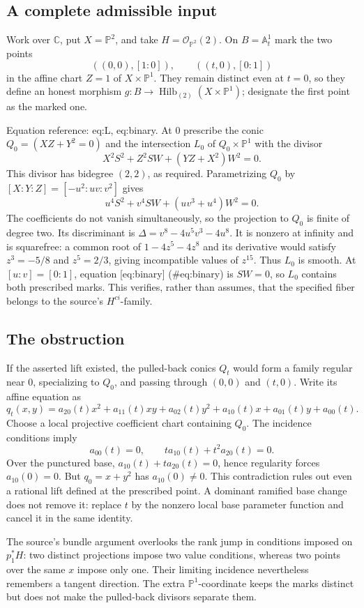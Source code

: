 \documentclass[10pt]{article}
\begin{document}
\subsection*{A complete admissible input}
Work over \(\mathbb C\), put \(X=\mathbb P^2\), and take \(H=\mathcal O_{\mathbb P^2}(2)\). On \(B=\mathbb A^1_t\) mark the two points \[((0,0),[1:0]),\qquad ((t,0),[0:1])\] in the affine chart \(Z=1\) of \(X\times\mathbb P^1\). They remain distinct even at \(t=0\), so they define an honest morphism \(g:B\to\operatorname{Hilb}_{(2)}(X\times\mathbb P^1)\); designate the first point as the marked one.\par
Equation reference: eq:L, eq:binary. At \(0\) prescribe the conic \(Q_0=(XZ+Y^2=0)\) and the intersection \(L_0\) of \(Q_0\times\mathbb P^1\) with the divisor \[
 X^2S^2+Z^2SW+(YZ+X^2)W^2=0.\] This divisor has bidegree \((2,2)\), as required. Parametrizing \(Q_0\) by \([X:Y:Z]=[-u^2:uv:v^2]\) gives \[
 u^4S^2+v^4SW+(uv^3+u^4)W^2=0.\] The coefficients do not vanish simultaneously, so the projection to \(Q_0\) is finite of degree two. Its discriminant is \(\Delta=v^8-4u^5v^3-4u^8\). It is nonzero at infinity and is squarefree: a common root of \(1-4z^5-4z^8\) and its derivative would satisfy \(z^3=-5/8\) and \(z^5=2/3\), giving incompatible values of \(z^{15}\). Thus \(L_0\) is smooth. At \([u:v]=[0:1]\), equation [eq:binary] (\#eq:binary) is \(SW=0\), so \(L_0\) contains both prescribed marks. This verifies, rather than assumes, that the specified fiber belongs to the source’s \(H^{ci}\)-family.\par
\subsection*{The obstruction}
If the asserted lift existed, the pulled-back conics \(Q_t\) would form a family regular near \(0\), specializing to \(Q_0\), and passing through \((0,0)\) and \((t,0)\). Write its affine equation as \[q_t(x,y)=a_{20}(t)x^2+a_{11}(t)xy+a_{02}(t)y^2
              +a_{10}(t)x+a_{01}(t)y+a_{00}(t).\] Choose a local projective coefficient chart containing \(Q_0\). The incidence conditions imply \[a_{00}(t)=0,\qquad t a_{10}(t)+t^2a_{20}(t)=0.\] Over the punctured base, \(a_{10}(t)+t a_{20}(t)=0\), hence regularity forces \(a_{10}(0)=0\). But \(q_0=x+y^2\) has \(a_{10}(0)\neq0\). This contradiction rules out even a rational lift defined at the prescribed point. A dominant ramified base change does not remove it: replace \(t\) by the nonzero local base parameter function and cancel it in the same identity.\par
The source’s bundle argument overlooks the rank jump in conditions imposed on \(p_1^*H\): two distinct projections impose two value conditions, whereas two points over the same \(x\) impose only one. Their limiting incidence nevertheless remembers a tangent direction. The extra \(\mathbb P^1\)-coordinate keeps the marks distinct but does not make the pulled-back divisors separate them.\par
\end{document}
